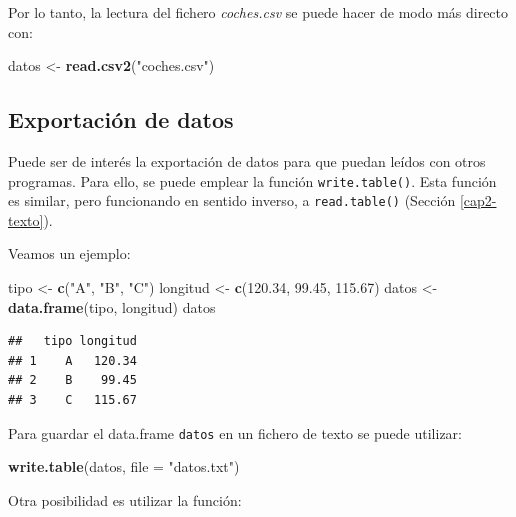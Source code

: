 \documentclass[]{book}
\newenvironment{Shaded}{\begin{snugshade}}{\end{snugshade}}
\newcommand{\KeywordTok}[1]{\textcolor[rgb]{0.13,0.29,0.53}{\textbf{#1}}}
\newcommand{\DataTypeTok}[1]{\textcolor[rgb]{0.13,0.29,0.53}{#1}}
\newcommand{\FloatTok}[1]{\textcolor[rgb]{0.00,0.00,0.81}{#1}}
\newcommand{\StringTok}[1]{\textcolor[rgb]{0.31,0.60,0.02}{#1}}
\newcommand{\NormalTok}[1]{#1}
\begin{document}
Por lo tanto, la lectura del fichero \emph{coches.csv} se puede hacer de
modo más directo con:

\begin{Shaded}
\begin{Highlighting}[]
\NormalTok{datos <-}\StringTok{ }\KeywordTok{read.csv2}\NormalTok{(}\StringTok{"coches.csv"}\NormalTok{)}
\end{Highlighting}
\end{Shaded}

\subsection{Exportación de datos}\label{exportacion-de-datos}

Puede ser de interés la exportación de datos para que puedan leídos con
otros programas. Para ello, se puede emplear la función
\texttt{write.table()}. Esta función es similar, pero funcionando en
sentido inverso, a \texttt{read.table()} (Sección \ref{cap2-texto}).

Veamos un ejemplo:

\begin{Shaded}
\begin{Highlighting}[]
\NormalTok{tipo <-}\StringTok{ }\KeywordTok{c}\NormalTok{(}\StringTok{"A"}\NormalTok{, }\StringTok{"B"}\NormalTok{, }\StringTok{"C"}\NormalTok{)}
\NormalTok{longitud <-}\StringTok{ }\KeywordTok{c}\NormalTok{(}\FloatTok{120.34}\NormalTok{, }\FloatTok{99.45}\NormalTok{, }\FloatTok{115.67}\NormalTok{)}
\NormalTok{datos <-}\StringTok{ }\KeywordTok{data.frame}\NormalTok{(tipo, longitud)}
\NormalTok{datos}
\end{Highlighting}
\end{Shaded}

\begin{verbatim}
##   tipo longitud
## 1    A   120.34
## 2    B    99.45
## 3    C   115.67
\end{verbatim}

Para guardar el data.frame \texttt{datos} en un fichero de texto se
puede utilizar:

\begin{Shaded}
\begin{Highlighting}[]
\KeywordTok{write.table}\NormalTok{(datos, }\DataTypeTok{file =} \StringTok{"datos.txt"}\NormalTok{)}
\end{Highlighting}
\end{Shaded}

Otra posibilidad es utilizar la función:
\end{document}
